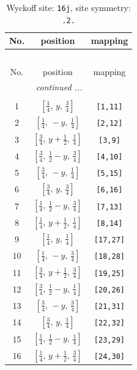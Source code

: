 \documentclass[fleqn,8pt]{jsarticle}
\begin{document}
\renewcommand{\arraystretch}{1.2}
\begin{longtable}{ccc}
\caption{Wyckoff site: {\tt 16j}, site symmetry: {\tt .2.}}
 \\
 \hline \hline
No. & position & mapping \\ \hline \endfirsthead

\multicolumn{2}{l}{\tablename\ \thetable{}} \\
 \hline \hline
No. & position & mapping \\ \hline \endhead

 \hline \hline
\multicolumn{2}{r}{\footnotesize\it continued ...} \\ \endfoot

 \hline \hline
\multicolumn{2}{r}{} \\ \endlastfoot

1 & $\left[ \frac{1}{4},\, y,\, \frac{3}{4} \right]$ & {\tt [1,11]} \\ \hline
2 & $\left[ \frac{1}{4},\, - y,\, \frac{1}{4} \right]$ & {\tt [2,12]} \\ \hline
3 & $\left[ \frac{3}{4},\, y + \frac{1}{2},\, \frac{1}{4} \right]$ & {\tt [3,9]} \\ \hline
4 & $\left[ \frac{3}{4},\, \frac{1}{2} - y,\, \frac{3}{4} \right]$ & {\tt [4,10]} \\ \hline
5 & $\left[ \frac{3}{4},\, - y,\, \frac{1}{4} \right]$ & {\tt [5,15]} \\ \hline
6 & $\left[ \frac{3}{4},\, y,\, \frac{3}{4} \right]$ & {\tt [6,16]} \\ \hline
7 & $\left[ \frac{1}{4},\, \frac{1}{2} - y,\, \frac{3}{4} \right]$ & {\tt [7,13]} \\ \hline
8 & $\left[ \frac{1}{4},\, y + \frac{1}{2},\, \frac{1}{4} \right]$ & {\tt [8,14]} \\ \hline
9 & $\left[ \frac{1}{4},\, y,\, \frac{1}{4} \right]$ & {\tt [17,27]} \\ \hline
10 & $\left[ \frac{1}{4},\, - y,\, \frac{3}{4} \right]$ & {\tt [18,28]} \\ \hline
11 & $\left[ \frac{3}{4},\, y + \frac{1}{2},\, \frac{3}{4} \right]$ & {\tt [19,25]} \\ \hline
12 & $\left[ \frac{3}{4},\, \frac{1}{2} - y,\, \frac{1}{4} \right]$ & {\tt [20,26]} \\ \hline
13 & $\left[ \frac{3}{4},\, - y,\, \frac{3}{4} \right]$ & {\tt [21,31]} \\ \hline
14 & $\left[ \frac{3}{4},\, y,\, \frac{1}{4} \right]$ & {\tt [22,32]} \\ \hline
15 & $\left[ \frac{1}{4},\, \frac{1}{2} - y,\, \frac{1}{4} \right]$ & {\tt [23,29]} \\ \hline
16 & $\left[ \frac{1}{4},\, y + \frac{1}{2},\, \frac{3}{4} \right]$ & {\tt [24,30]} \\
\end{longtable}
\end{document}
